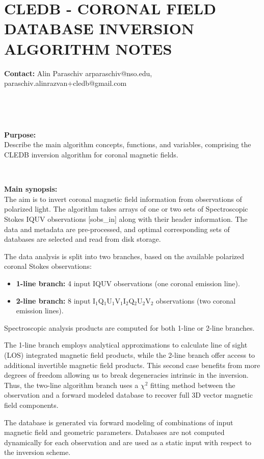 \documentclass{article}
\begin{document}
\section*{CLEDB - CORONAL FIELD DATABASE INVERSION \\ ALGORITHM NOTES}

\textbf{Contact:} Alin Paraschiv arparaschiv@nso.edu, paraschiv.alinrazvan+cledb@gmail.com

~

~

\textbf{Purpose:\\} 
Describe the main algorithm concepts, functions, and variables, comprising the CLEDB inversion algorithm for coronal magnetic fields.

~

\textbf{Main synopsis:\\} 
The aim is to invert coronal magnetic field information from observations of polarized light. The algorithm takes arrays of one or two sets of Spectroscopic Stokes IQUV observations [sobs\_in] along with their header information. The data and metadata are pre-processed, and optimal corresponding sets of databases are selected and read from disk storage. 

The data analysis is split into two branches, based on the available polarized coronal Stokes observations: 
\begin{itemize}
\item \textbf{1-line branch:} 4 input IQUV observations (one coronal emission line).
\item \textbf{2-line branch:} 8 input I$_1$Q$_1$U$_1$V$_1$I$_2$Q$_2$U$_2$V$_2$ observations (two coronal emission lines).
\end{itemize} 

Spectroscopic analysis products are computed for both 1-line or 2-line branches.

The 1-line branch employs analytical approximations to calculate line of sight (LOS) integrated magnetic field products, while the 2-line branch offer access to additional invertible magnetic field products. This second case benefits from more degrees of freedom allowing us to break degeneracies intrinsic in the inversion. Thus, the two-line algorithm branch uses a $\chi^2$ fitting method between the observation and a forward modeled database to recover full 3D vector magnetic field components.  

The database is generated via forward modeling of combinations of input magnetic field and geometric parameters.  Databases are not computed dynamically for each observation and are used as a static input with respect to the inversion scheme.
\end{document}
